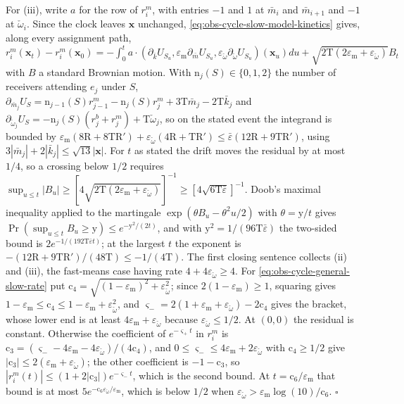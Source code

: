 For (iii), write $a$ for the row of $r^m_i$, with entries $-1$ and $1$ at
$\bar m_i$ and $\bar m_{i+1}$ and $-1$ at $\check\omega_i$. Since the clock leaves
$\mathbf x$ unchanged, \eqref{eq:obs-cycle-slow-model-kinetics} gives, along every
assignment path,
$r^m_i(\mathbf x_t)-r^m_i(\mathbf x_0)=-\int_0^ta\cdot(\partial_{\bar k}U_{S_u},\varepsilon_{\mathrm m}\partial_{\bar m}U_{S_u},\varepsilon_{\check\omega}\partial_{\check\omega} U_{S_u})(\mathbf x_u)du+\sqrt{2\mathrm T(2\varepsilon_{\mathrm m}+\varepsilon_{\check\omega})}B_t$
with $B$ a standard Brownian motion. With $\mathrm n_j(S)\in\{0,1,2\}$ the number of
receivers attending $e_j$ under $S$,
$\partial_{\bar m_j}U_S=\mathrm n_{j-1}(S)r^m_{j-1}-\mathrm n_j(S)r^m_j+3\mathrm T\bar m_j-2\mathrm T\bar k_j$
and $\partial_{\check\omega_j}U_S=-\mathrm n_j(S)(r^b_j+r^m_j)+\mathrm T\check\omega_j$, so on the
stated event the integrand is bounded by
$\varepsilon_{\mathrm m}(8\mathrm R+8\mathrm T\mathrm R')+\varepsilon_{\check\omega}(4\mathrm R+\mathrm T\mathrm R')\le\bar\varepsilon(12\mathrm R+9\mathrm T\mathrm R')$,
using $3|\bar m_j|+2|\bar k_j|\le\sqrt{13}|\mathbf x|$. For $t$ as stated the drift
moves the residual by at most $1/4$, so a crossing below $1/2$ requires
$\sup_{u\le t}|B_u|\ge[4\sqrt{2\mathrm T(2\varepsilon_{\mathrm m}+\varepsilon_{\check\omega})}]^{-1}\ge[4\sqrt{6\mathrm T\bar\varepsilon}]^{-1}$.
Doob's maximal inequality applied to the martingale $\exp(\theta B_u-\theta^2u/2)$
with $\theta=\mathrm y/t$ gives $\Pr(\sup_{u\le t}B_u\ge\mathrm y)\le e^{-\mathrm y^2/(2t)}$,
and with $\mathrm y^2=1/(96\mathrm T\bar\varepsilon)$ the two-sided bound is
$2e^{-1/(192\mathrm T\bar\varepsilon t)}$; at the largest $t$ the exponent is
$-(12\mathrm R+9\mathrm T\mathrm R')/(48\mathrm T)\le-1/(4\mathrm T)$. The first
closing sentence collects (ii) and (iii), the fast-means case having rate
$4+4\varepsilon_{\check\omega}\ge4$. For \eqref{eq:obs-cycle-general-slow-rate} put
$\mathrm c_4=\sqrt{(1-\varepsilon_{\mathrm m})^2+\varepsilon_{\check\omega}^2}$; since
$2(1-\varepsilon_{\mathrm m})\ge1$, squaring gives
$1-\varepsilon_{\mathrm m}\le\mathrm c_4\le1-\varepsilon_{\mathrm m}+\varepsilon_{\check\omega}^2$,
and $\varsigma_-=2(1+\varepsilon_{\mathrm m}+\varepsilon_{\check\omega})-2\mathrm c_4$
gives the bracket, whose lower end is at least
$4\varepsilon_{\mathrm m}+\varepsilon_{\check\omega}$ because
$\varepsilon_{\check\omega}\le1/2$. At $(0,0)$ the residual is constant. Otherwise
the coefficient of $e^{-\varsigma_+t}$ in $r^m_i$ is
$\mathrm c_3=(\varsigma_--4\varepsilon_{\mathrm m}-4\varepsilon_{\check\omega})/(4\mathrm c_4)$,
and $0\le\varsigma_-\le4\varepsilon_{\mathrm m}+2\varepsilon_{\check\omega}$ with
$\mathrm c_4\ge1/2$ give
$|\mathrm c_3|\le2(\varepsilon_{\mathrm m}+\varepsilon_{\check\omega})$; the other
coefficient is $-1-\mathrm c_3$, so
$|r^m_i(t)|\le(1+2|\mathrm c_3|)e^{-\varsigma_-t}$, which is the second bound. At
$t=\mathrm c_6/\varepsilon_{\mathrm m}$ that bound is at most
$5e^{-\mathrm c_6\varepsilon_{\check\omega}/\varepsilon_{\mathrm m}}$, which is below
$1/2$ when $\varepsilon_{\check\omega}>\varepsilon_{\mathrm m}\log(10)/\mathrm c_6$.
$\square$

